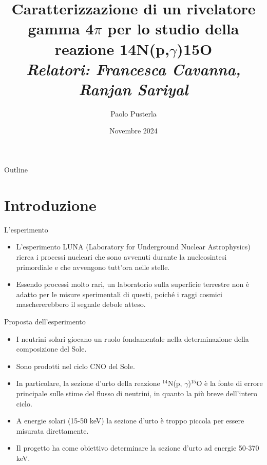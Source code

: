 \documentclass [xcolor=svgnames] {beamer}
\title[Short Title]{Caratterizzazione di un rivelatore gamma 4$\pi$ per lo studio della reazione 14N(p,$\gamma$)15O \\ \textit{Relatori: Francesca Cavanna, Ranjan Sariyal}}
\author[P. Pusterla]{Paolo Pusterla}
\institute[UniTo]{Università degli Studi di Torino}
\date{Novembre 2024}
\begin{document}
	
	\begin{frame}
		\titlepage
	\end{frame}
	
	\begin{frame}{Outline}
		\tableofcontents
	\end{frame}
	
	\section{Introduzione}
	\begin{frame}{L'esperimento}
		\begin{itemize}
			\item<1-> L'esperimento LUNA (Laboratory for Underground Nuclear Astrophysics) ricrea i processi nucleari che sono avvenuti durante la nucleosintesi primordiale e che avvengono tutt'ora nelle stelle.
			\item<2-> Essendo processi molto rari, un laboratorio sulla superficie terrestre non è adatto per le misure sperimentali di questi, poiché i raggi cosmici maschererebbero il segnale debole atteso.
		\end{itemize}
	\end{frame}
	
	
	\begin{frame}{Proposta dell'esperimento}
		\begin{itemize}
			\item<1-> I neutrini solari giocano un ruolo fondamentale nella determinazione della composizione del Sole.
			\item<2-> Sono prodotti nel ciclo CNO del Sole.
			\item<3-> In particolare, la sezione d'urto della reazione $^{14}$N(p, $\gamma$)$^{15}$O è la fonte di errore principale sulle stime del flusso di neutrini, in quanto la più breve dell'intero ciclo.
			\item<4-> A energie solari (15-50 keV) la sezione d'urto è troppo piccola per essere misurata direttamente.
			\item<5-> Il progetto ha come obiettivo determinare la sezione d'urto ad energie 50-370 keV.
		\end{itemize}
	\end{frame}
		
\end{document}
